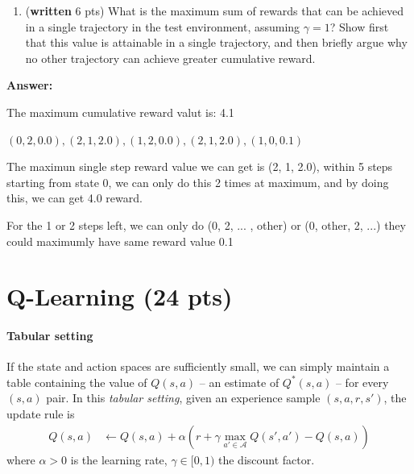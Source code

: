\documentclass{article}
\begin{document}
\begin{enumerate}
\item (\textbf{written} 6 pts) What is the maximum sum of rewards that can be achieved in a single trajectory in the test environment, assuming $\gamma = 1$? Show first that this value is attainable in a single trajectory, and then briefly argue why no other trajectory can achieve greater cumulative reward.
\end{enumerate}

\textbf{Answer:}

The maximum cumulative reward valut is: 4.1

$ {(0, 2, 0.0), (2, 1, 2.0), (1, 2, 0.0), (2, 1, 2.0), (1, 0, 0.1)} $

The maximun single step reward value we can get is (2, 1, 2.0), within 5 steps starting from state 0, we can only do this 2 times at maximum, and by doing this, we can get 4.0 reward.

For the 1 or 2 steps left, we can only do (0, 2, ... , other) or (0, other, 2, ...) they could maximumly have same reward value 0.1

\section{Q-Learning (24 pts)}\label{q-learn}

\paragraph{Tabular setting}
If the state and action spaces are sufficiently small, we can simply maintain a table containing the value of $Q(s,a)$ -- an estimate of $Q^*(s,a)$ -- for every $(s,a)$ pair.
In this \emph{tabular setting}, given an experience sample $ (s, a, r, s') $, the update rule is
\begin{equation}
\label{eq1}
\begin{split}
Q(s,a) &\leftarrow Q(s,a) + \alpha\left(r+\gamma \max_{a' \in \mathcal{A}}Q\left(s',a' \right) - Q\left(s, a\right)\right)
\end{split}
\end{equation}
where $\alpha > 0$ is the learning rate, $\gamma \in [0,1)$ the discount factor.
\end{document}
